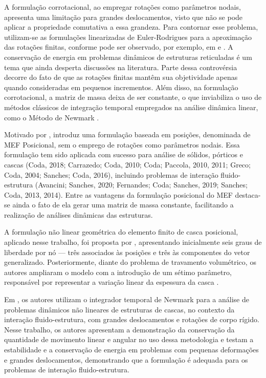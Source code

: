 A formulação corrotacional, ao empregar rotações como parâmetros nodais, apresenta uma limitação para grandes deslocamentos, visto que não se pode aplicar a propriedade comutativa a essa grandeza. Para contornar esse problema, utilizam-se as formulações linearizadas de Euler-Rodrigues para a aproximação das rotações finitas, conforme pode ser observado, por exemplo, em  e . A conservação de energia em problemas dinâmicos de estruturas reticuladas é um tema que ainda desperta discussões na literatura. Parte dessa controvérsia decorre do fato de que as rotações finitas mantêm sua objetividade apenas quando consideradas em pequenos incrementos. Além disso, na formulação corrotacional, a matriz de massa deixa de ser constante, o que inviabiliza o uso de métodos clássicos de integração temporal empregados na análise dinâmica linear, como o Método de Newmark  \cite{SanchesC:2013}.

Motivado por ,  introduz uma formulação baseada em posições, denominada de MEF Posicional, sem o emprego de rotações como parâmetros nodais. Essa formulação tem sido aplicada com sucesso para análise de sólidos, pórticos e cascas (Coda, 2018; Carrazedo;
Coda, 2010; Coda; Paccola, 2010, 2011; Greco; Coda, 2004; Sanches;
Coda, 2016), incluindo problemas de interação fluido-estrutura (Avancini; Sanches, 2020;
Fernandes; Coda; Sanches, 2019; Sanches; Coda, 2013, 2014). Entre as vantagens da formulação posicional do MEF destaca-se ainda o fato de ela gerar uma matriz de massa constante, facilitando a realização de análises dinâmicas das estruturas.

A formulação não linear geométrica do elemento finito de casca posicional, aplicado nesse trabalho, foi proposta por , apresentando inicialmente seis graus de liberdade por nó — três associados às posições e três às componentes do vetor generalizado. Posteriormente, diante do problema de travamento volumétrico, os autores ampliaram o modelo com a introdução de um sétimo parâmetro, responsável por representar a variação linear da espessura da casca \cite{CodaP:2008}.

Em , os autores utilizam o integrador temporal de Newmark para a análise de problemas dinâmicos não lineares de estruturas de cascas, no contexto da interação fluido-estrutura, com grandes deslocamentos e rotações de corpo rígido. Nesse trabalho, os autores apresentam a demonstração da conservação da quantidade de movimento linear e angular no uso dessa metodologia e testam a estabilidade e a conservação de energia em problemas com pequenas deformações e grandes deslocamentos, demonstrando que a formulação é adequada para os problemas de interação fluido-estrutura.

